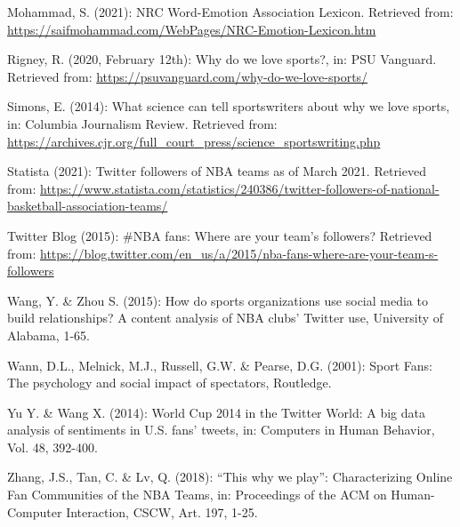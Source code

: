 \documentclass[
]{article}
\begin{document}
Mohammad, S. (2021): NRC Word-Emotion Association Lexicon. Retrieved
from: \url{https://saifmohammad.com/WebPages/NRC-Emotion-Lexicon.htm}

Rigney, R. (2020, February 12th): Why do we love sports?, in: PSU
Vanguard. Retrieved from:
\url{https://psuvanguard.com/why-do-we-love-sports/}

Simons, E. (2014): What science can tell sportswriters about why we love
sports, in: Columbia Journalism Review. Retrieved from:
\url{https://archives.cjr.org/full_court_press/science_sportswriting.php}

Statista (2021): Twitter followers of NBA teams as of March 2021.
Retrieved from:
\url{https://www.statista.com/statistics/240386/twitter-followers-of-national-basketball-association-teams/}

Twitter Blog (2015): \#NBA fans: Where are your team's followers?
Retrieved from:
\url{https://blog.twitter.com/en_us/a/2015/nba-fans-where-are-your-team-s-followers}

Wang, Y. \& Zhou S. (2015): How do sports organizations use social media
to build relationships? A content analysis of NBA clubs' Twitter use,
University of Alabama, 1-65.

Wann, D.L., Melnick, M.J., Russell, G.W. \& Pearse, D.G. (2001): Sport
Fans: The psychology and social impact of spectators, Routledge.

Yu Y. \& Wang X. (2014): World Cup 2014 in the Twitter World: A big data
analysis of sentiments in U.S. fans' tweets, in: Computers in Human
Behavior, Vol. 48, 392-400.

Zhang, J.S., Tan, C. \& Lv, Q. (2018): ``This why we play'':
Characterizing Online Fan Communities of the NBA Teams, in: Proceedings
of the ACM on Human-Computer Interaction, CSCW, Art. 197, 1-25.
\end{document}
